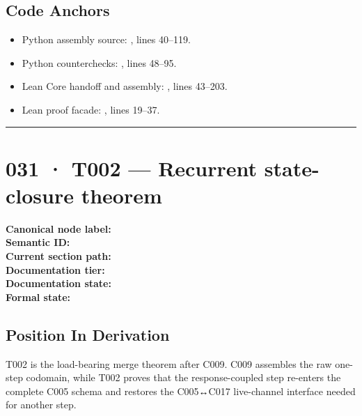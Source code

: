 \subsection{Code Anchors}\label{code-anchors-19}

\begin{itemize}
\tightlist
\item
  Python assembly source: \texttt{\protect{}},
  lines 40--119.
\item
  Python counterchecks:
  \texttt{\protect{}}, lines 48--95.
\item
  Lean Core handoff and assembly:
  \texttt{\protect{}}, lines 43--203.
\item
  Lean proof facade:
  \texttt{\protect{}}, lines
  19--37.
\end{itemize}

\begin{center}\rule{0.5\linewidth}{0.5pt}\end{center}

\section{031 · T002 --- Recurrent state-closure
theorem}\label{t002-recurrent-state-closure-theorem}

\textbf{Canonical node label:} \texttt{\protect{}}\\
\textbf{Semantic ID:} \texttt{\protect{}}\\
\textbf{Current section path:} \texttt{\protect{}}\\
\textbf{Documentation tier:} \texttt{\protect{}}\\
\textbf{Documentation state:} \texttt{\protect{}}\\
\textbf{Formal state:}
\texttt{\protect{}}

\subsection{Position In Derivation}\label{position-in-derivation-27}

T002 is the load-bearing merge theorem after C009. C009 assembles the
raw one-step codomain, while T002 proves that the response-coupled step
re-enters the complete C005 \texttt{\protect{}} schema and
restores the C005↔C017 live-channel interface needed for another step.

